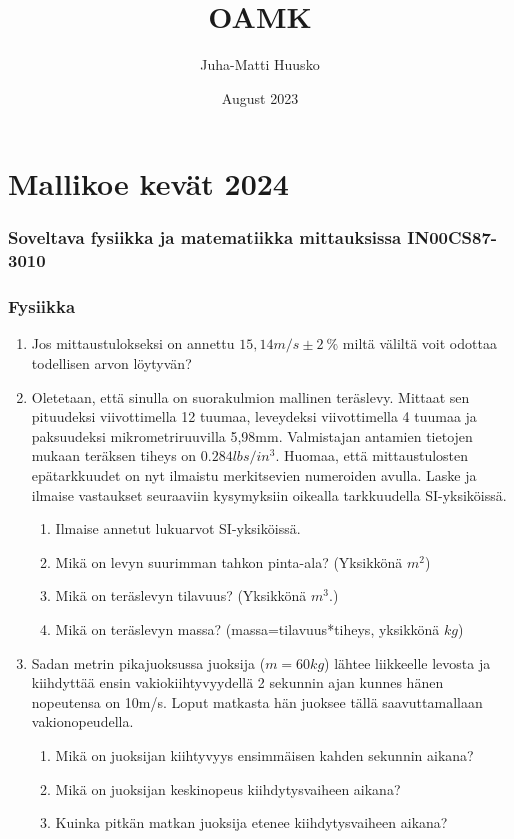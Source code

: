 \documentclass[12pt]{article}
\title{OAMK}
\author{Juha-Matti Huusko}
\date{August 2023}
\begin{document}
\thispagestyle{empty}

\section*{Mallikoe kevät 2024}
\subsubsection*{Soveltava fysiikka ja matematiikka mittauksissa IN00CS87-3010}
\subsubsection*{Fysiikka}

\begin{enumerate}
\item Jos mittaustulokseksi on annettu $15,14m/s\pm 2~\%$ miltä väliltä voit odottaa todellisen arvon löytyvän?
\item Oletetaan, että sinulla on suorakulmion mallinen teräslevy. Mittaat sen pituudeksi viivottimella 12 tuumaa, leveydeksi viivottimella 4 tuumaa ja paksuudeksi mikrometriruuvilla 5,98mm. Valmistajan antamien tietojen mukaan teräksen tiheys on  $0.284 lbs/in^3$. Huomaa, että mittaustulosten epätarkkuudet on nyt ilmaistu merkitsevien numeroiden avulla. Laske ja ilmaise vastaukset seuraaviin kysymyksiin oikealla tarkkuudella SI-yksiköissä.
\begin{enumerate}
\item Ilmaise annetut lukuarvot SI-yksiköissä.
\item Mikä on levyn suurimman tahkon pinta-ala? (Yksikkönä $m^2$)
\item Mikä on teräslevyn tilavuus? (Yksikkönä $m^3$.)
\item Mikä on teräslevyn massa?
(massa=tilavuus*tiheys, yksikkönä $kg$)
\end{enumerate}
\item Sadan metrin pikajuoksussa juoksija ($m=60kg$) lähtee liikkeelle levosta ja kiihdyttää ensin vakiokiihtyvyydellä 2 sekunnin ajan kunnes hänen nopeutensa on 10m/s. Loput matkasta hän juoksee tällä saavuttamallaan vakionopeudella.
\begin{enumerate}
\item Mikä on juoksijan kiihtyvyys ensimmäisen kahden sekunnin aikana?
\item Mikä on juoksijan keskinopeus kiihdytysvaiheen aikana?
\item Kuinka pitkän matkan juoksija etenee kiihdytysvaiheen aikana?

\end{enumerate}
\end{enumerate}
\end{document}
